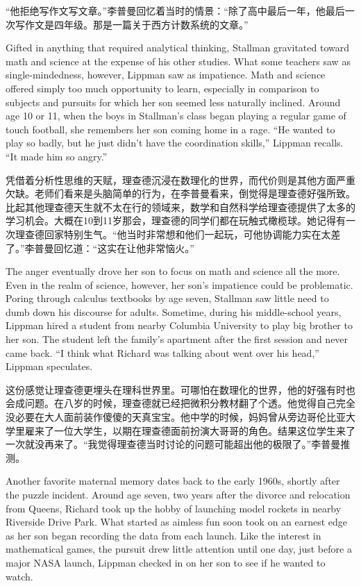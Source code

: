 \ifdefined\chs
“他拒绝写作文写文章。”李普曼回忆着当时的情景：“除了高中最后一年，他最后一次写作文是四年级。那是一篇关于西方计数系统的文章。”
\fi

\ifdefined\eng
Gifted in anything that required analytical thinking, Stallman gravitated toward math and science at the expense of his other studies. What some teachers saw as single-mindedness, however, Lippman saw as impatience. Math and science offered simply too much opportunity to learn, especially in comparison to subjects and pursuits for which her son seemed less naturally inclined. Around age 10 or 11, when the boys in Stallman's class began playing a regular game of touch football, she remembers her son coming home in a rage. ``He wanted to play so badly, but he just didn't have the coordination skills,'' Lippman recalls. ``It made him so angry.''
\fi

\ifdefined\chs
凭借着分析性思维的天赋，理查德沉浸在数理化的世界，而代价则是其他方面严重欠缺。老师们看来是头脑简单的行为，在李普曼看来，倒觉得是理查德好强所致。比起其他理查德天生就不太在行的领域来，数学和自然科学给理查德提供了太多的学习机会。大概在10到11岁那会，理查德的同学们都在玩触式橄榄球。她记得有一次理查德回家特别生气。“他当时非常想和他们一起玩，可他协调能力实在太差了。”李普曼回忆道：“这实在让他非常恼火。”
\fi

\ifdefined\eng
The anger eventually drove her son to focus on math and science all the more. Even in the realm of science, however, her son's impatience could be problematic. Poring through calculus textbooks by age seven, Stallman saw little need to dumb down his discourse for adults. Sometime, during his middle-school years, Lippman hired a student from nearby Columbia University to play big brother to her son. The student left the family's apartment after the first session and never came back. ``I think what Richard was talking about went over his head,'' Lippman speculates.
\fi

\ifdefined\chs
这份感觉让理查德更埋头在理科世界里。可哪怕在数理化的世界，他的好强有时也会成问题。在八岁的时候，理查德就已经把微积分教材翻了个透。他觉得自己完全没必要在大人面前装作傻傻的天真宝宝。他中学的时候，妈妈曾从旁边哥伦比亚大学里雇来了一位大学生，以期在理查德面前扮演大哥哥的角色。结果这位学生来了一次就没再来了。“我觉得理查德当时讨论的问题可能超出他的极限了。”李普曼推测。
\fi

\ifdefined\eng
Another favorite maternal memory dates back to the early 1960s, shortly after the puzzle incident. Around age seven, two years after the divorce and relocation from Queens, Richard took up the hobby of launching model rockets in nearby Riverside Drive Park. What started as aimless fun soon took on an earnest edge as her son began recording the data from each launch. Like the interest in mathematical games, the pursuit drew little attention until one day, just before a major NASA launch, Lippman checked in on her son to see if he wanted to watch.
\fi

